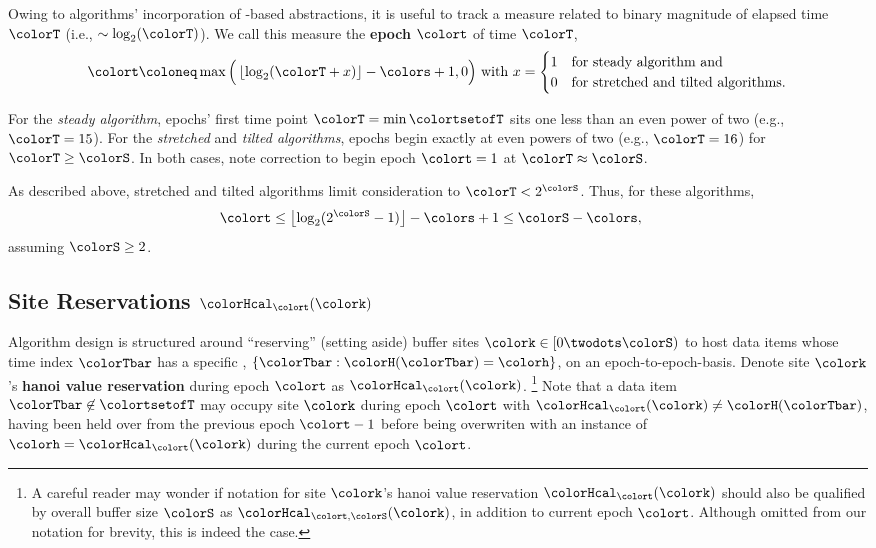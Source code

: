 Owing to algorithms' incorporation of \hv{}-based abstractions, it is useful to track a measure related to binary magnitude of elapsed time $\colorT$ (i.e., $\sim \log_2(\colorT)$).
We call this measure the \textbf{epoch} $\colort$ of time $\colorT$,
\begin{equation}
\colort
\coloneq
\max\Big(\left\lfloor \log_2(\colorT+x) \right\rfloor - \colors + 1, 0\Big)
\text{ with }
x =
\begin{cases}
1 & \text{for steady algorithm and} \\
0 & \text{for stretched and tilted algorithms.}
\end{cases}
\label{eqn:epoch-defn}
\end{equation}

For the \textit{steady algorithm}, epochs' first time point $\colorT = \min\colortsetofT$  sits one less than an even power of two (e.g.,  $\colorT = 15$).
For the \textit{stretched} and \textit{tilted algorithms}, epochs begin exactly at even powers of two (e.g., $\colorT = 16$) for $\colorT \geq \colorS$.
In both cases, note correction to begin epoch $\colort=1$ at $\colorT \approx \colorS$.

As described above, stretched and tilted algorithms limit consideration to $\colorT < 2^{\colorS}$.
Thus, for these algorithms,
\begin{align*}
\colort &\leq \left\lfloor\log_2(2^{\colorS} - 1)\right\rfloor - \colors + 1
\leq \colorS - \colors,
\end{align*}
assuming $\colorS \geq 2$.

\subsection{Site Reservations $\colorHcal_{\colort}(\colork)$}
\label{sec:notation-reservation}

Algorithm design is structured around ``reserving'' (setting aside) buffer sites $\colork \in [0 \twodots \colorS)$ to host data items whose time index $\colorTbar$ has a specific \hv{}, $\{\colorTbar : \colorH(\colorTbar) = \colorh \}$, on an epoch-to-epoch-basis.
Denote site $\colork$'s \textbf{hanoi value reservation} during epoch $\colort$ as $\colorHcal_{\colort}(\colork)$.%
\footnote{
A careful reader may wonder if notation for site $\colork$'s hanoi value reservation $\colorHcal_{\colort}(\colork)$ should also be qualified by overall buffer size $\colorS$ as $\colorHcal_{\colort,\colorS}(\colork)$, in addition to current epoch $\colort$.
Although omitted from our notation for brevity, this is indeed the case.
}
Note that a data item $\colorTbar \not\in \colortsetofT$ may occupy site $\colork$ during epoch $\colort$ with $\colorHcal_{\colort}(\colork) \neq \colorH(\colorTbar)$, having been held over from the previous epoch $\colort - 1$ before being overwriten with an instance of \hv{} $\colorh = \colorHcal_{\colort}(\colork)$ during the current epoch $\colort$.

